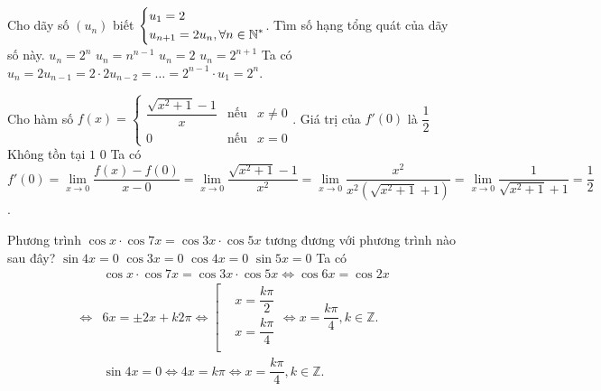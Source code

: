 \begin{ex}%
	Cho dãy số $\left(u_n\right)$ biết $\left\{\begin{aligned}
		& u_1=2 \\ 
		& {u}_{n+1}=2u_n, \forall n \in \mathbb{N}^{*}\end{aligned}\right.$. Tìm số hạng tổng quát của dãy số này.
	\choice
		{\True $u_n=2^n$}
		{$u_n={n}^{n-1}$}
		{$u_n=2$}
		{$u_n={2}^{n+1}$}
	\loigiai
		{
			Ta có
			$u_n=2{u}_{n-1}=2 \cdot 2{u}_{n-2}= \ldots ={2}^{n-1} \cdot u_1=2^n$.
		}
\end{ex}

\begin{ex}%
	Cho hàm số $f(x) = \left\{
	\begin{array}{ccc}
		\dfrac{\sqrt{x^2+1}-1}{x} &\text{nếu} & x\ne 0 \\
		0 &\text{nếu} &x=0
	\end{array}\right.$. 
	Giá trị của $f'(0)$ là
	\choice
		{\True $\dfrac{1}{2}$}
		{Không tồn tại}
		{$1$}
		{$0$}
	\loigiai
		{
			Ta có \\ 
			$f'(0) = \lim \limits_{x \to 0} \dfrac{f(x) - f(0)}{x - 0} = \lim \limits_{x \to 0} \dfrac{\sqrt{x^2+1}-1}{x^2} = \lim \limits_{x \to 0} \dfrac{x^2}{x^2 \left(\sqrt{x^2+1}+1\right)} = \lim \limits_{x \to 0} \dfrac{1}{\sqrt{x^2+1} + 1} = \dfrac{1}{2}$.
		}
\end{ex}

\begin{ex}%
	Phương trình $\cos x\cdot \cos 7x=\cos 3x\cdot \cos 5x$ tương đương với phương trình nào sau đây?
	\choice
		{\True $\sin 4x=0$}
		{$\cos 3x=0$}
		{$\cos 4x=0$}
		{$\sin 5x=0$}
	\loigiai
		{
			Ta có
			\begin{eqnarray*}
				&\cos x \cdot \cos 7x=\cos 3x\cdot \cos 5x\Leftrightarrow \cos 6x=\cos 2x \\
				\Leftrightarrow &6x=\pm 2x+k2\pi \Leftrightarrow \left[\begin{aligned}
				&x=\dfrac{k\pi}{2} \\
				&x=\dfrac{k\pi}{4}\\
				\end{aligned}\right.\Leftrightarrow x=\dfrac{k\pi}{4},k\in \mathbb{Z}.\\
			 	&\sin 4x =0\Leftrightarrow 4x=k\pi \Leftrightarrow x=\dfrac{k\pi}{4},k\in \mathbb{Z}.
			\end{eqnarray*}		
		}
\end{ex}

